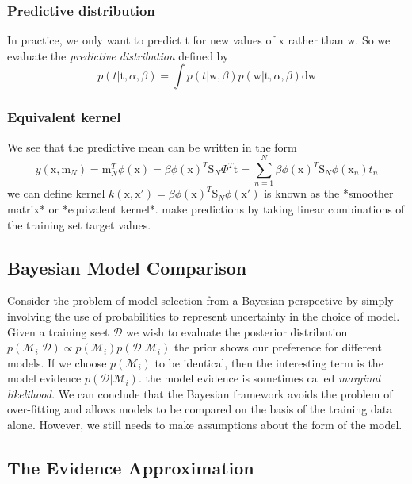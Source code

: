 \documentclass[a4paper]{book}
\begin{document}
\subsubsection{Predictive distribution }
In practice, we only want to predict t for new values of $\mathrm x$ rather than $\mathrm w$. So we evaluate the \emph{predictive distribution} defined by
\begin{equation}\label{eq2.2.6}
  p(t|\mathrm t,\alpha,\beta) = \int p(t|\mathrm w,\beta)p(\mathrm w|\mathrm t,\alpha,\beta)\mathrm {dw}
\end{equation}
\subsubsection{Equivalent kernel }
We see that the predictive mean can be written in the form
$$y(\mathrm x,\mathrm m_N) =\mathrm m_N^T\phi(\mathrm x)=\beta\phi(\mathrm x)^T\mathrm S_N\Phi^T\mathrm t=\sum_{n=1}^N\beta\phi(\mathrm x)^T\mathrm S_N\phi(\mathrm x_n)t_n$$
we can define kernel
$k(\mathrm x,\mathrm x') = \beta\phi(\mathrm x)^T\mathrm S_N\phi(\mathrm x')$ is known as the *smoother matrix* or *equivalent kernel*. make predictions by taking linear combinations of the training set target values.
\subsection{Bayesian Model Comparison}
Consider the problem of model selection from a Bayesian perspective by simply involving the use of probabilities to represent uncertainty in the choice of model.\newline
Given a training seet $\mathcal D$ we wish to evaluate the posterior distribution $p(\mathcal M_i|\mathcal D) \propto p(\mathcal M_i)p(\mathcal D|\mathcal M_i)$\newline
the prior shows our preference for different models.\newline
If we choose $p(\mathcal M_i)$ to be identical, then the interesting term is the model evidence $p(\mathcal D|\mathcal M_i)$.\newline
the model evidence is sometimes called \emph{marginal likelihood.}
We can conclude that the Bayesian framework avoids the problem of over-fitting  and allows models to be compared on the basis of the training data alone. However, we still needs to make assumptions about the form of the model.
\subsection{The Evidence Approximation}
\end{document}
